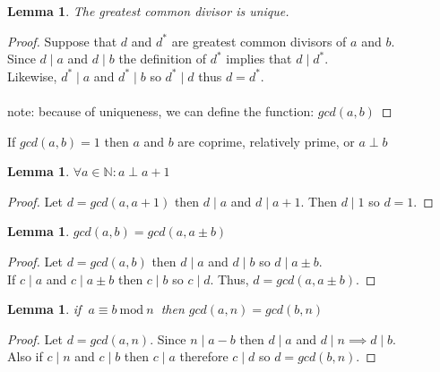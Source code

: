 \documentclass[12pt]{extarticle}
\renewcommand\qedsymbol{$\square$}
\newcommand{\divides}{\mid}
\newcommand{\N}{\mathbb{N}}
\newtheorem{lemma}[theorem]{Lemma}
\newenvironment{definition}[1][Definition:]{\begin{trivlist}
\item[\hskip \labelsep {\bfseries #1}]}{\end{trivlist}}
\newenvironment{lproof}{\begin{proof} \renewcommand{\qedsymbol}{}}{\end{proof}}
\renewcommand{\mod}[3]{\: #1 \equiv #2 \: \mathrm{mod} \: #3 \:}
\begin{document}
\begin{lemma}
\label{gcduniqe}
The greatest common divisor is unique.
\end{lemma}

\begin{lproof}
Suppose that $d$ and $d^*$ are greatest common divisors of $a$ and $b$. \\
Since $d \divides a$ and $d \divides b$ the definition of $d^*$ implies that $d \divides d^*$. \\ 
Likewise, $d^* \divides a$ and $d^* \divides b$ so $d^* \divides d$ thus $d = d^*$.\\\\
note: because of uniqueness, we can define the function: $gcd(a,b)$ 
\end{lproof}

\begin{definition}
If $gcd(a,b) = 1$ then $a$ and $b$ are coprime, relatively prime, or $a \perp b$
\end{definition}

\begin{lemma}
$\forall a \in \N : a \perp a+1$
\end{lemma}

\begin{lproof}
Let $d = gcd(a,a+1)$ then $d \divides a$ and $d \divides a+1$. Then $d \divides 1$ so $d = 1$.
\end{lproof}

\begin{lemma}
$gcd(a,b) = gcd(a,a \pm b)$
\end{lemma}

\begin{lproof}
Let $d = gcd(a,b)$ then $d \divides a$ and $d \divides b$ so $d \divides a \pm b$. \\
If $c \divides a$ and $c \divides a \pm b$ then $c \divides b$ so $c \divides d$. Thus, $d = gcd(a,a \pm b)$.
\end{lproof}


\begin{lemma}
\label{congruentgcdequal}
if $\mod{a}{b}{n}$ then $gcd(a,n) = gcd(b, n)$
\end{lemma}

\begin{lproof}
Let $d = gcd(a,n)$. Since $n \divides a-b$ then $d \divides a$ and $d \divides n \implies d \divides b$. \\ Also if $c \divides n$ and $c \divides b$ then $c \divides a$ therefore $c \divides d$ so $d = gcd(b,n)$.
\end{lproof}
\end{document}
